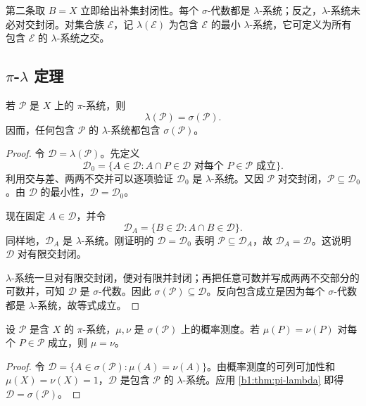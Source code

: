 第二条取 \(B=X\) 立即给出补集封闭性。每个 \(\sigma\)-代数都是 \(\lambda\)-系统；反之，\(\lambda\)-系统未必对交封闭。对集合族 \(\mathcal E\)，记 \(\lambda(\mathcal E)\) 为包含 \(\mathcal E\) 的最小 \(\lambda\)-系统，它可定义为所有包含 \(\mathcal E\) 的 \(\lambda\)-系统之交。

\subsection{\texorpdfstring{\(\pi\)}{π}-\texorpdfstring{\(\lambda\)}{λ} 定理}
\label{b1:subsec:010303}

\begin{theorem}
\label{b1:thm:pi-lambda}
若 \(\mathcal P\) 是 \(X\) 上的 \(\pi\)-系统，则
\[
\lambda(\mathcal P)=\sigma(\mathcal P).
\]
因而，任何包含 \(\mathcal P\) 的 \(\lambda\)-系统都包含 \(\sigma(\mathcal P)\)。
\end{theorem}
\begin{proof}
令 \(\mathcal D=\lambda(\mathcal P)\)。先定义
\[
\mathcal D_0
=\{A\in\mathcal D:A\cap P\in\mathcal D
  \text{ 对每个 }P\in\mathcal P\text{ 成立}\}.
\]
利用交与差、两两不交并可以逐项验证 \(\mathcal D_0\) 是 \(\lambda\)-系统。又因 \(\mathcal P\) 对交封闭，\(\mathcal P\subseteq\mathcal D_0\)。由 \(\mathcal D\) 的最小性，\(\mathcal D=\mathcal D_0\)。

现在固定 \(A\in\mathcal D\)，并令
\[
\mathcal D_A=\{B\in\mathcal D:A\cap B\in\mathcal D\}.
\]
同样地，\(\mathcal D_A\) 是 \(\lambda\)-系统。刚证明的 \(\mathcal D=\mathcal D_0\) 表明 \(\mathcal P\subseteq\mathcal D_A\)，故 \(\mathcal D_A=\mathcal D\)。这说明 \(\mathcal D\) 对有限交封闭。

\(\lambda\)-系统一旦对有限交封闭，便对有限并封闭；再把任意可数并写成两两不交部分的可数并，可知 \(\mathcal D\) 是 \(\sigma\)-代数。因此 \(\sigma(\mathcal P)\subseteq\mathcal D\)。反向包含成立是因为每个 \(\sigma\)-代数都是 \(\lambda\)-系统，故等式成立。
\end{proof}

\begin{corollary}
\label{b1:cor:measure-uniqueness-pi}
设 \(\mathcal P\) 是含 \(X\) 的 \(\pi\)-系统，\(\mu,\nu\) 是 \(\sigma(\mathcal P)\) 上的概率测度。若 \(\mu(P)=\nu(P)\) 对每个 \(P\in\mathcal P\) 成立，则 \(\mu=\nu\)。
\end{corollary}
\begin{proof}
令 \(\mathcal D=\{A\in\sigma(\mathcal P):\mu(A)=\nu(A)\}\)。由概率测度的可列可加性和 \(\mu(X)=\nu(X)=1\)，\(\mathcal D\) 是包含 \(\mathcal P\) 的 \(\lambda\)-系统。应用 \cref{b1:thm:pi-lambda} 即得 \(\mathcal D=\sigma(\mathcal P)\)。
\end{proof}


